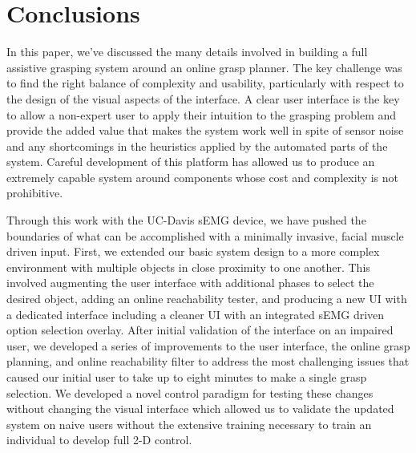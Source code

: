 \section{Conclusions}
In this paper, we've discussed the many details involved in building a full assistive grasping system around an online grasp planner. The key challenge was to find the right balance of complexity and usability, particularly with respect to the design of the visual aspects of the interface. A clear user interface is the key to allow a non-expert user to apply their intuition to the grasping problem and provide the added value that makes the system work well in spite of sensor noise and any shortcomings in the heuristics applied by the automated parts of the system. Careful development of this platform has allowed us to produce an extremely capable system around components whose cost and complexity is not prohibitive. 

Through this work with the UC-Davis sEMG device, we have pushed the boundaries of what can be accomplished with a minimally invasive, facial muscle driven input. First, we extended our basic system design to a more complex environment with multiple objects in close proximity to one another. This involved augmenting the user interface with additional phases to select the desired object, adding an online reachability tester, and producing a new UI with a dedicated interface including a cleaner UI with an integrated sEMG driven option selection overlay. After initial validation of the interface on an impaired user, we developed a series of improvements to the user interface, the online grasp planning, and online reachability filter to address the most challenging issues that caused our initial user to take up to eight minutes to make a single grasp selection. We developed a novel control paradigm for testing these changes without changing the visual interface which allowed us to validate the updated system on naive users without the extensive training necessary to train an individual to develop full 2-D control. 


